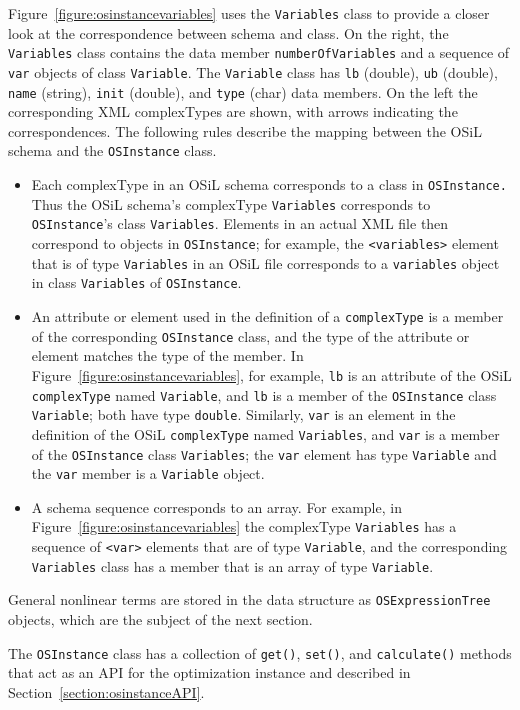 \documentclass[11pt]{article}
\newcounter{Fig}
\renewcommand{\_}{{\char"5F}}
\renewcommand{\{}{{\char"7B}}
\renewcommand{\}}{{\char"7D}}
\renewcommand{\^}{{\char"0D}}
\renewcommand{\'}{{\char"0D}}
\newcommand{\Titem}{\item[$\triangleright$]}
\begin{document}
\begin{enumerate}[Step 1:]
Figure~\ref{figure:osinstancevariables} uses the {\tt Variables} class to provide a closer look at the correspondence between schema and class. 
On the right, the {\tt Variables} class contains the data member {\tt numberOfVariables} and a sequence of {\tt var} objects of class {\tt Variable}. The {\tt Variable} class has {\tt lb} (double), {\tt ub} (double), {\tt name} (string), {\tt init} (double), and {\tt type} (char) data members. On the left the corresponding XML complexTypes are shown, with arrows indicating the correspondences. The following rules describe the mapping between the OSiL schema and the {\tt OSInstance} class.
%
\begin{itemize}

\Titem  Each complexType in an OSiL schema corresponds to a class in {\tt OSInstance.} 
Thus the OSiL schema's complexType {\tt Variables} corresponds to {\tt OSInstance}'s class {\tt Variables}.  
Elements in an actual XML file then correspond to objects in {\tt OSInstance}; 
for example, the {\tt <variables>} element that is of type {\tt Variables} in an OSiL file 
corresponds to a {\tt variables} object in class {\tt Variables} of {\tt OSInstance}.

\Titem An attribute or element used in the definition of a {\tt complexType} is a member of the corresponding {\tt OSInstance} class, and the type of the attribute or element matches the type of the member.  In Figure~\ref{figure:osinstancevariables}, for example, {\tt lb} is an attribute of the OSiL {\tt complexType} named {\tt Variable}, and {\tt lb} is a member of the {\tt OSInstance} class {\tt Variable}; both have type {\tt double}.  Similarly, {\tt var} is an element in the definition of the OSiL {\tt complexType} named {\tt Variables}, and {\tt var} is a member of the {\tt OSInstance} class {\tt Variables}; the {\tt var} element has type {\tt Variable} and the {\tt var} member is a {\tt Variable} object.

\Titem A schema sequence corresponds to an array. For example, in Figure~\ref{figure:osinstancevariables} the complexType {\tt Variables} has a sequence of {\tt <var>} elements that are of type {\tt Variable}, and the corresponding {\tt Variables} class has a member that is an array of type {\tt Variable}.

\end{itemize}
%
General nonlinear terms are stored in the data structure as {\tt OSExpressionTree} objects, which are the subject of the next section.

     The {\tt OSInstance} class has a collection of {\tt get()}, {\tt set()}, and {\tt calculate()} methods that act as an API for the optimization instance and described in Section~\ref{section:osinstanceAPI}.





\end{enumerate}
\end{document}
